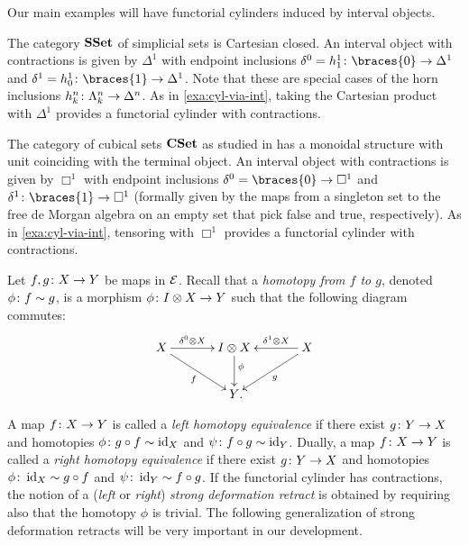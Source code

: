 \documentclass[reqno,10pt,a4paper,oneside,draft]{amsart}
\begin{document}
Our main examples will have functorial cylinders induced by interval objects.

\begin{example} \label{exa:cyl-in-sset}
The category $\mathbf{SSet}$ of simplicial sets is Cartesian closed.
An interval object with contractions is given by $\Delta^1$ with endpoint inclusions $\lcyl = h_1^1 \co \braces{0} \to \Delta^1$ and $\rcyl = h_0^1 \co \braces{1} \to \Delta^1$.
Note that these are special cases of the horn inclusions $h_k^n \colon \Lambda_k^n \to \Delta^n$.
As in \cref{exa:cyl-via-int}, taking the Cartesian product with $\Delta^1$ provides a functorial cylinder with contractions.
\end{example}

\begin{example} \label{exa:cyl-in-cuset}
The category of cubical sets $\mathbf{CSet}$ as studied in \cite{coquand-variation} has a monoidal structure with unit coinciding with the terminal object.
An interval object with contractions is given by $\Box^1$ with endpoint inclusions $\lcyl = \braces{0} \to \Box^1$ and $\rcyl \co \braces{1} \to \Box^1$ (formally given by the maps from a singleton set to the free de Morgan algebra on an empty set that pick false and true, respectively).
As in \cref{exa:cyl-via-int}, tensoring with $\Box^1$ provides a functorial cylinder with contractions.
\end{example}

Let $f, g \colon X \to Y$ be maps in $\mathcal{E}$.
Recall that a \emph{homotopy from $f$ to $g$}, denoted $\phi \colon f \sim g$, is a morphism $\phi \colon I \otimes X \to Y$ such that the following diagram commutes:
\begin{equation}
\label{equ:homotopy}
\begin{gathered}
\xymatrix@C=1.2cm{
  X
  \ar[r]^-{\lcyl \otimes X}
  \ar[dr]_{f}
&
  \interval \otimes X
  \ar[d]^(0.4){\phi}
&
  X
  \ar[dl]^{g}
  \ar[l]_-{\rcyl \otimes X}
\\&
  Y
\rlap{.}}
\end{gathered}
\end{equation}

A map $f \colon X \to Y$ is called a \emph{left homotopy equivalence} if there exist $g \colon Y \to X$ and homotopies $\phi \colon g \mathbin{\circ} f \sim \operatorname{id}_X $ and $\psi \colon f \mathbin{\circ} g \sim \operatorname{id}_Y$.
Dually, a map $f \colon X \to Y$ is called a \emph{right homotopy equivalence} if there exist $g \colon Y \to X$ and homotopies $\phi \colon \operatorname{id}_X \sim g \mathbin{\circ} f$ and $\psi \colon \operatorname{id}_Y \sim f \mathbin{\circ} g$.
If the functorial cylinder has contractions, the notion of a (\emph{left} or \emph{right}) \emph{strong deformation retract} is obtained by requiring also that the homotopy $\phi$ is trivial.
The following generalization of strong deformation retracts will be very important in our development.
\end{document}
